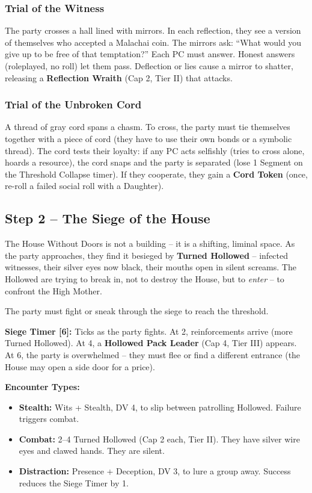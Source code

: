 \documentclass[10pt,twoside]{book}
\begin{document}
\subsubsection*{Trial of the Witness}
The party crosses a hall lined with mirrors. In each reflection, they see a version of themselves who accepted a Malachai coin. The mirrors ask: ``What would you give up to be free of that temptation?'' Each PC must answer. Honest answers (roleplayed, no roll) let them pass. Deflection or lies cause a mirror to shatter, releasing a \textbf{Reflection Wraith} (Cap 2, Tier II) that attacks.

\subsubsection*{Trial of the Unbroken Cord}
A thread of gray cord spans a chasm. To cross, the party must tie themselves together with a piece of cord (they have to use their own bonds or a symbolic thread). The cord tests their loyalty: if any PC acts selfishly (tries to cross alone, hoards a resource), the cord snaps and the party is separated (lose 1 Segment on the Threshold Collapse timer). If they cooperate, they gain a \textbf{Cord Token} (once, re-roll a failed social roll with a Daughter).

\subsection{Step 2 -- The Siege of the House}
The House Without Doors is not a building -- it is a shifting, liminal space. As the party approaches, they find it besieged by \textbf{Turned Hollowed} -- infected witnesses, their silver eyes now black, their mouths open in silent screams. The Hollowed are trying to break in, not to destroy the House, but to \textit{enter} -- to confront the High Mother.

The party must fight or sneak through the siege to reach the threshold.

\textbf{Siege Timer [6]:} Ticks as the party fights. At 2, reinforcements arrive (more Turned Hollowed). At 4, a \textbf{Hollowed Pack Leader} (Cap 4, Tier III) appears. At 6, the party is overwhelmed -- they must flee or find a different entrance (the House may open a side door for a price).

\textbf{Encounter Types:}
\begin{itemize}
\item \textbf{Stealth:} Wits + Stealth, DV 4, to slip between patrolling Hollowed. Failure triggers combat.
\item \textbf{Combat:} 2--4 Turned Hollowed (Cap 2 each, Tier II). They have silver wire eyes and clawed hands. They are silent.
\item \textbf{Distraction:} Presence + Deception, DV 3, to lure a group away. Success reduces the Siege Timer by 1.
\end{itemize}
\end{document}
